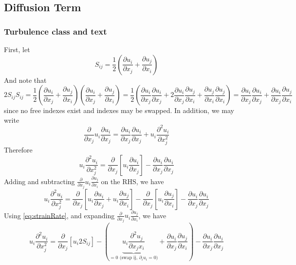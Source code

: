\documentclass[11pt]{article}
\newcommand{\PD}{\partial}
\begin{document}
\subsection{Diffusion Term}
\subsubsection{Turbulence class and text}
First, let
\begin{equation} \label{eq:strainRate}
	S_{ij} = \frac{1}{2}
	\left(
	\frac{\PD u_i}{\PD x_j} +
	\frac{\PD u_j}{\PD x_i}
	\right)
\end{equation}
And note that
\begin{equation} \label{eq:strainIdentity}
	2 S_{ij} S_{ij} =
	\frac{1}{2} \left( \frac{\PD u_i}{\PD x_j} + \frac{\PD u_j}{\PD x_i} \right)
	\left( \frac{\PD u_i}{\PD x_j} + \frac{\PD u_j}{\PD x_i} \right)
	= \frac{1}{2} \left( \frac{\PD u_i}{\PD x_j} \frac{\PD u_i}{\PD x_j}
	+ 2 \frac{\PD u_i}{\PD x_j} \frac{\PD u_j}{\PD x_i}
	+ \frac{\PD u_j}{\PD x_i} \frac{\PD u_j}{\PD x_i} \right)
	= \frac{\PD u_i}{\PD x_j} \frac{\PD u_i}{\PD x_j}
	+ \frac{\PD u_i}{\PD x_j} \frac{\PD u_j}{\PD x_i}
\end{equation}
since no free indexes exist and indexes may be swapped. In addition, we may write
\begin{equation}
	\frac{\PD}{\PD x_j} u_i \frac{\PD u_i}{\PD x_j} =
	\frac{\PD u_i}{\PD x_j}\frac{\PD u_i}{\PD x_j} +
	u_i \frac{\PD^2 u_i}{\PD x_j^2}
\end{equation}
Therefore
\begin{equation} \label{eq:secondIdentity}
	u_i \frac{\PD^2 u_i}{\PD x_j^2} =
	\frac{\PD}{\PD x_j} \left[ u_i \frac{\PD u_i}{\PD x_j} \right] -
	\frac{\PD u_i}{\PD x_j}\frac{\PD u_i}{\PD x_j}
\end{equation}
Adding and subtracting $\frac{\PD}{\PD x_j} u_i \frac{\PD u_j}{\PD x_i}$ on the RHS, we have
\begin{equation}
	u_i \frac{\PD^2 u_i}{\PD x_j^2} =
	\frac{\PD}{\PD x_j} \left[ u_i \frac{\PD u_i}{\PD x_j} + u_i \frac{\PD u_j}{\PD x_i} \right] -
	\frac{\PD}{\PD x_j} \left[ u_i \frac{\PD u_j}{\PD x_i} \right] -
	\frac{\PD u_i}{\PD x_j}\frac{\PD u_i}{\PD x_j}
\end{equation}
Using \ref{eq:strainRate}, and expanding $\frac{\PD}{\PD x_j} u_i \frac{\PD u_j}{\PD x_i}$, we have
\begin{equation}
	u_i \frac{\PD^2 u_i}{\PD x_j^2} =
	\frac{\PD}{\PD x_j} \left[ u_i 2 S_{ij} \right] -
	\left(
	\underbrace{u_i \frac{\PD^2 u_j}{\PD x_j x_i}}_{=0 \text{ (swap ij, $\PD_i u_i =0$)}}
	+
	\frac{\PD u_i}{\PD x_j} \frac{\PD u_j}{\PD x_i}
	\right) -
	\frac{\PD u_i}{\PD x_j}\frac{\PD u_i}{\PD x_j}
\end{equation}
\end{document}
